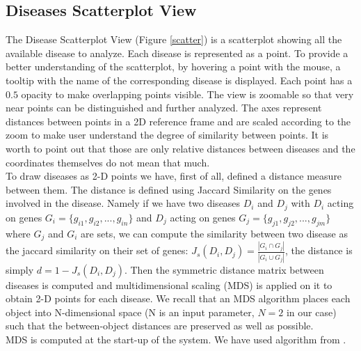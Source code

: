 \documentclass[12pt,twocolumn,twoside]{article}
\begin{document}
\subsection*{Diseases Scatterplot View}
The Disease Scatterplot View (Figure \ref{scatter}) is a scatterplot showing all the available disease to analyze. Each disease is represented as a point. To provide a better understanding of the scatterplot, by hovering a point with the mouse, a tooltip with the name of the corresponding disease is displayed. Each point has a $0.5$ opacity to make overlapping points visible. The view is zoomable so that very near points can be distinguished and further analyzed. The axes represent distances between points in a 2D reference frame and are scaled according to the zoom to make user understand the degree of similarity between points. It is worth to point out that those are only relative distances between diseases and the coordinates themselves do not mean that much. \\ 
To draw diseases as 2-D points we have, first of all, defined a distance measure between them. The distance is defined using Jaccard Similarity on the genes involved in the disease. Namely if we have two diseases $D_i$ and $D_j$ with $D_i$ acting on genes $G_i=\{g_{i1},g_{i2},...,g_{in}\}$ and $D_j$ acting on genes $G_j=\{g_{j1},g_{j2},...,g_{jm}\}$ where $G_j$ and $G_i$ are sets, we can compute the similarity between two disease as the jaccard similarity on their set of genes: $J_s(D_i,D_j) = \frac{|G_i \cap G_j|}{|G_i \cup G_j|}$, the distance is simply $d =1-J_s(D_i,D_j)$.  Then the symmetric distance matrix between diseases is computed and multidimensional scaling (MDS) is applied on it to obtain 2-D points for each disease. We recall that an MDS algorithm places each object into N-dimensional space (N is an input parameter, $N=2$ in our case) such that the between-object distances are preserved as well as possible.\\ MDS is computed at the start-up of the system. We have used algorithm from \cite{mds_js}.
\end{document}
